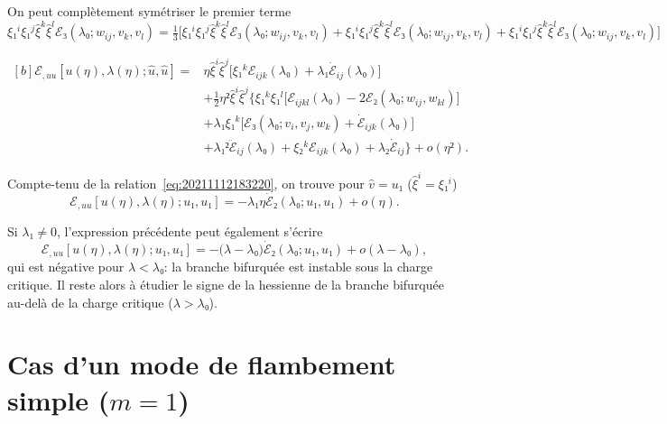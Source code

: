 \documentclass[12pt, final]{amsart}
\begin{document}
On peut complètement symétriser le premier terme
\begin{equation}
  ξ₁^iξ₁^j\hat{ξ}^k\hat{ξ}^lℰ₃(λ₀; w_{ij}, v_k, v_l)
  =\tfrac13\bigl[ξ₁^iξ₁^j\hat{ξ}^k\hat{ξ}^lℰ₃(λ₀; w_{ij}, v_k, v_l)
  +ξ₁^iξ₁^j\hat{ξ}^k\hat{ξ}^lℰ₃(λ₀; w_{ij}, v_k, v_l)
  +ξ₁^iξ₁^j\hat{ξ}^k\hat{ξ}^lℰ₃(λ₀; w_{ij}, v_k, v_l)\bigr]
\end{equation}

\begin{equation}
  \label{eq:20220203144500}
  \begin{aligned}[b]
    ℰ_{,uu}[u(η), λ(η); \hat{u}, \hat{u}]
    ={}&η\hat{ξ}^i\hat{ξ}^j\bigl[ξ₁^kℰ_{ijk}(λ₀)+λ₁\dot{ℰ}_{ij}(λ₀)\bigr]\\
    &+\tfrac12η²\hat{ξ}^i\hat{ξ}^j\bigl\{ξ₁^kξ₁^l\bigl[ℰ_{ijkl}(λ₀)
    -2ℰ₂(λ₀; w_{ij}, w_{kl})\bigr]\\
    &+λ₁ξ₁^k\bigl[ℰ₃(λ₀; v_i, v_j, w_k)+\dot{ℰ}_{ijk}(λ₀)\bigr]\\
    &+λ₁²\ddot{ℰ}_{ij}(λ₀)+ξ₂^kℰ_{ijk}(λ₀)+λ₂\dot{ℰ}_{ij}\bigr\}+o(η²).
  \end{aligned}
\end{equation}

Compte-tenu de la relation~\eqref{eq:20211112183220}, on trouve pour
\(\hat{v}=u₁\) (\(\hat{ξ}^i=ξ₁^i\))
\begin{equation}
  ℰ_{,uu}[u(η), λ(η); u₁, u₁]=-λ₁η\dot{ℰ}₂(λ₀; u₁, u₁)+o(η).
\end{equation}

Si \(λ₁≠0\), l'expression précédente peut également s'écrire
\begin{equation}
  ℰ_{,uu}[u(η), λ(η); u₁, u₁]=-\bigl(λ-λ₀\bigr)\dot{ℰ}₂(λ₀; u₁, u₁)+o(λ-λ₀),
\end{equation}
qui est négative pour \(λ<λ₀\): la branche bifurquée est instable sous la
charge critique. Il reste alors à étudier le signe de la hessienne de la
branche bifurquée au-delà de la charge critique (\(λ>λ₀\)).

\section{Cas d'un mode de flambement simple (\(m=1\))}
\end{document}
